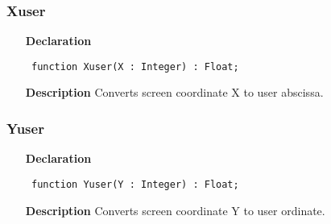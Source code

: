 \documentclass[12pt,a4paper,oneside]{report}
\newcommand{\declarationitem}[1]{\textbf{#1}}
\newcommand{\descriptiontitle}[1]{\textbf{#1}}
\newcommand{\code}[1]{\texttt{#1}}
\begin{document}
\subsubsection{Xuser}
\label{uwinplot-Xuser}
\begin{itemize}\item[\declarationitem{Declaration}\hfill]
	\begin{flushleft}
		\code{
			function Xuser(X : Integer) : Float;}
		
	\end{flushleft}
	
	\par
	\item[\descriptiontitle{Description}]
	Converts screen coordinate X to user abscissa.
	
\end{itemize}
\subsubsection{Yuser}
\label{uwinplot-Yuser}
\begin{itemize}\item[\declarationitem{Declaration}\hfill]
	\begin{flushleft}
		\code{
			function Yuser(Y : Integer) : Float;}
		
	\end{flushleft}
	
	\par
	\item[\descriptiontitle{Description}]
	Converts screen coordinate Y to user ordinate.
	
\end{itemize}
\end{document}
